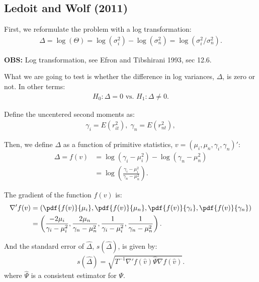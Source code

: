 \documentclass[12pt,oneside,a4paper]{article}
\begin{document}
\subsection{Ledoit and Wolf (2011)}

First, we reformulate the problem with a log transformation: 
\begin{align}
\Delta = \log(\Theta) =
\log(\sigma_{i}^{2}) - \log(\sigma_{n}^{2})  =
\log(\sigma_{i}^{2}/\sigma_{n}^{2}).
\end{align}

\noindent
{\footnotesize
\textbf{OBS:} Log transformation, see Efron and Tibshirani 1993, sec 12.6.}
\vspace{1 em}

What we are going to test is whether the difference in log variances, $\Delta$, is zero or not.
In other terms:
\begin{align*}
	H_{0}: \Delta=0 \text{ vs. } H_{1}: \Delta \neq 0.
\end{align*}

Define the uncentered second moments as:
\begin{align*}
	\gamma_{i} = E(r_{it}^{2}), \; \gamma_{n} = E(r_{nt}^{2}),
\end{align*}

Then, we define $\Delta$ as a function of primitive statistics, $v = (\mu_{i}, \mu_{n}, \gamma_{i}, \gamma_{n})'$:
\begin{align*}
\Delta = f(v) &=
\log{(\gamma_{i} - \mu^2_{i})} - \log{(\gamma_{n} - \mu^2_{n})} \\ &=
\log\left( {\frac{\gamma_{i} - \mu^2_{i}}{\gamma_{n} - \mu^2_{n}}} \right).
\end{align*}

The gradient of the function $f(v)$ is:
\begin{align}
\nabla' f(v) &=
\left( 
\pdf{f(v)}{\mu_{i}},
\pdf{f(v)}{\mu_{n}},
\pdf{f(v)}{\gamma_{i}},
\pdf{f(v)}{\gamma_{n}}
\right)
\\ &=
\left( 
\frac{-2 \mu_{i}}{\gamma_{i} - \mu_{i}^2},
\frac{2 \mu_{n}}{\gamma_{n} - \mu_{n}^2},
\frac{1}{\gamma_{i} - \mu_{i}^2},  
\frac{1}{\gamma_{n} - \mu_{n}^2}
\right).
\end{align}

And the standard error of $\hat{\Delta}$, $s(\hat{\Delta})$, is given by:
\begin{align}
	s(\hat{\Delta}) = \sqrt{T^{-1} \nabla'f(\hat{v}) \hat{\Psi} \nabla f(\hat{v})}.
\end{align}
where $\hat{\Psi}$ is a consistent estimator for $\Psi$.
\end{document}
